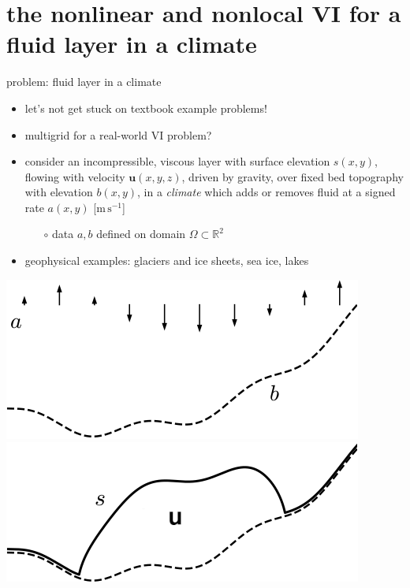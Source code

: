 \documentclass[svgnames,
               hyperref={colorlinks,citecolor=DeepPink4,linkcolor=FireBrick,urlcolor=Maroon},
               usepdftitle=false]  %
               {beamer}
\newcommand{\RR}{\mathbb{R}}
\newcommand{\bu}{\mathbf{u}}
\begin{document}
\section{the nonlinear and nonlocal VI for a fluid layer in a climate}

\begin{frame}{problem: fluid layer in a climate}

\begin{itemize}
\item let's not get stuck on textbook example problems!
\item multigrid for a real-world VI problem?
\item consider an incompressible, viscous layer with surface elevation $s(x,y)$, flowing with velocity $\bu(x,y,z)$, driven by gravity, over fixed bed topography with elevation $b(x,y)$, in a \emph{climate} which adds or removes fluid at a signed rate $a(x,y)$ [$\text{m}\,\text{s}^{-1}$]
    \begin{itemize}
    \item[$\circ$] data $a,b$ defined on domain $\Omega \subset \RR^2$
    \end{itemize}
\item geophysical examples: \alert{glaciers and ice sheets}, sea ice, lakes
\end{itemize}

\bigskip
\hfill \mbox{\includegraphics[height=0.25\textheight]{images/domain-data.png} \hspace{7mm} \includegraphics[height=0.25\textheight]{images/domain-velocity.png}}
\end{frame}
\end{document}
